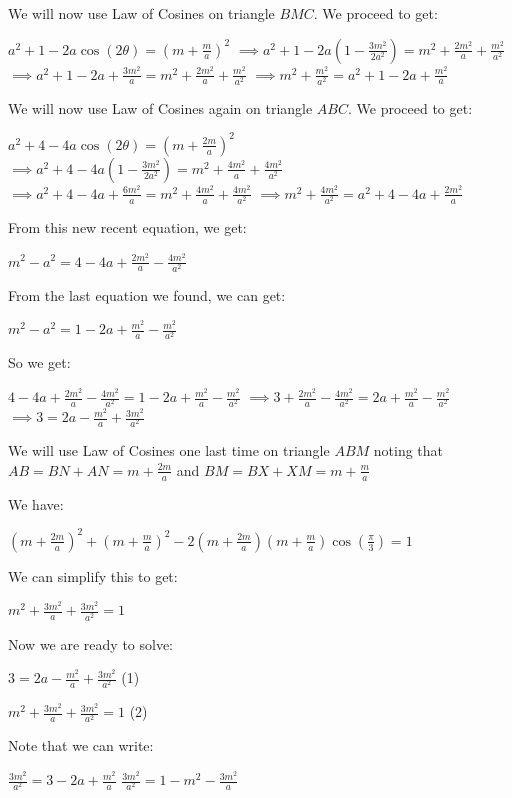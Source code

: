 \begin{enumerate}
 We will now use Law of Cosines on triangle $BMC$. We proceed to get:

 $a^{2} + 1 - 2a\cos(2\theta) = (m + \frac{m}{a})^{2}$
$\implies a^{2} + 1 - 2a(1 - \frac{3m^{2}}{2a^{2}}) = m^{2} + \frac{2m^{2}}{a} + \frac{m^{2}}{a^{2}}$
$\implies a^{2} + 1 - 2a + \frac{3m^{2}}{a} = m^{2} + \frac{2m^{2}}{a} + \frac{m^{2}}{a^{2}}$
$\implies m^{2} + \frac{m^{2}}{a^{2}} = a^{2} + 1 - 2a + \frac{m^{2}}{a}$

 
We will now use Law of Cosines again on triangle $ABC$. We proceed to get:

 $a^{2} + 4 - 4a\cos(2\theta) = (m + \frac{2m}{a})^{2}$
$\implies a^{2} + 4 - 4a(1 - \frac{3m^{2}}{2a^{2}}) = m^{2} + \frac{4m^{2}}{a} + \frac{4m^{2}}{a^{2}}$
$\implies a^{2} + 4 - 4a + \frac{6m^{2}}{a} = m^{2} + \frac{4m^{2}}{a} + \frac{4m^{2}}{a^{2}}$
$\implies m^{2} + \frac{4m^{2}}{a^{2}} = a^{2} + 4 - 4a + \frac{2m^{2}}{a}$

 From this new recent equation, we get:

 $m^{2} - a^{2} = 4 - 4a + \frac{2m^{2}}{a} - \frac{4m^{2}}{a^{2}}$

 From the last equation we found, we can get:

 $m^{2} - a^{2} = 1 - 2a + \frac{m^{2}}{a} - \frac{m^{2}}{a^{2}}$

 So we get:

 $4 - 4a + \frac{2m^{2}}{a} - \frac{4m^{2}}{a^{2}} = 1 - 2a + \frac{m^{2}}{a} - \frac{m^{2}}{a^{2}}$
$\implies 3 + \frac{2m^{2}}{a} - \frac{4m^{2}}{a^{2}} = 2a + \frac{m^{2}}{a} - \frac{m^{2}}{a^{2}}$
$\implies 3 = 2a - \frac{m^{2}}{a} + \frac{3m^{2}}{a^{2}}$

 We will use Law of Cosines one last time on triangle $ABM$ noting that $AB = BN + AN = m + \frac{2m}{a}$ and $BM = BX + XM = m + \frac{m}{a}$

 We have:

 $(m + \frac{2m}{a})^{2} + (m + \frac{m}{a})^{2} - 2(m + \frac{2m}{a})(m + \frac{m}{a})\cos(\frac{\pi}{3}) = 1$

 We can simplify this to get:

 $m^{2} + \frac{3m^{2}}{a} + \frac{3m^{2}}{a^{2}} = 1$

 Now we are ready to solve:

 $3 = 2a - \frac{m^{2}}{a} + \frac{3m^{2}}{a^{2}}$ (1)

 $m^{2} + \frac{3m^{2}}{a} + \frac{3m^{2}}{a^{2}} = 1$ (2)

 Note that we can write:

 $\frac{3m^{2}}{a^{2}} = 3 - 2a + \frac{m^{2}}{a}$
$\frac{3m^{2}}{a^{2}} = 1 - m^{2} - \frac{3m^{2}}{a}$


\end{enumerate}
